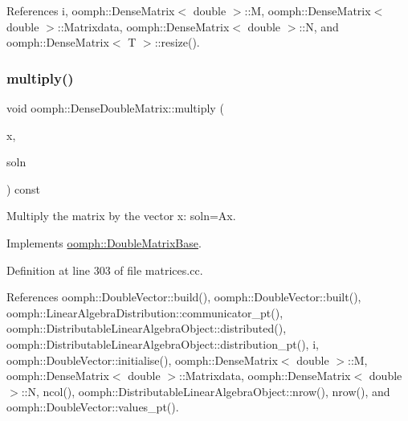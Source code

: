 References i, oomph\+::\+Dense\+Matrix$<$ double $>$\+::M, oomph\+::\+Dense\+Matrix$<$ double $>$\+::\+Matrixdata, oomph\+::\+Dense\+Matrix$<$ double $>$\+::N, and oomph\+::\+Dense\+Matrix$<$ T $>$\+::resize().

\mbox{\label{classoomph_1_1DenseDoubleMatrix_ab575dfefa0bdd8f495453baa5575a4a0}} 
\subsubsection{\texorpdfstring{multiply()}{multiply()}\hspace{0.1cm}{\footnotesize\ttfamily [1/2]}}
{\footnotesize\ttfamily void oomph\+::\+Dense\+Double\+Matrix\+::multiply (\begin{DoxyParamCaption}\item[{const \hyperlink{classoomph_1_1DoubleVector}{Double\+Vector} \&}]{x,  }\item[{\hyperlink{classoomph_1_1DoubleVector}{Double\+Vector} \&}]{soln }\end{DoxyParamCaption}) const\hspace{0.3cm}{\ttfamily [virtual]}}



Multiply the matrix by the vector x\+: soln=Ax. 



Implements \hyperlink{classoomph_1_1DoubleMatrixBase_a78204eab557e0dc99618e41a28a5c092}{oomph\+::\+Double\+Matrix\+Base}.



Definition at line 303 of file matrices.\+cc.



References oomph\+::\+Double\+Vector\+::build(), oomph\+::\+Double\+Vector\+::built(), oomph\+::\+Linear\+Algebra\+Distribution\+::communicator\+\_\+pt(), oomph\+::\+Distributable\+Linear\+Algebra\+Object\+::distributed(), oomph\+::\+Distributable\+Linear\+Algebra\+Object\+::distribution\+\_\+pt(), i, oomph\+::\+Double\+Vector\+::initialise(), oomph\+::\+Dense\+Matrix$<$ double $>$\+::M, oomph\+::\+Dense\+Matrix$<$ double $>$\+::\+Matrixdata, oomph\+::\+Dense\+Matrix$<$ double $>$\+::N, ncol(), oomph\+::\+Distributable\+Linear\+Algebra\+Object\+::nrow(), nrow(), and oomph\+::\+Double\+Vector\+::values\+\_\+pt().



